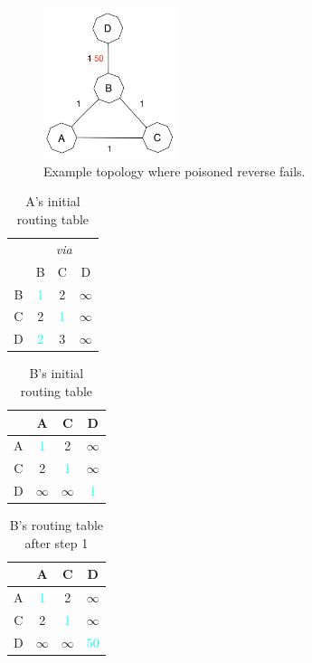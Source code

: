 \documentclass[12pt,a4paper]{article}
\begin{document}
\begin{figure}[!ht]
\centering
\includegraphics[width=0.35\textwidth]{Fail.png}
\caption{Example topology where poisoned reverse fails.}
\label{fig:fail}
\end{figure}

\begin{table}[!ht]
\centering
\begin{tabular}{c|ccc}
	& \multicolumn{3}{c}{\textit{via}} \\
	&	B			&	C			&	D			\\
\hline
B	& 	\textcolor{Cyan}{1}	&	2			&	$\infty$	\\
C	&	2			&	\textcolor{Cyan}{1}	&	$\infty$	\\
D	&	\textcolor{Cyan}{2}	&	3			&	$\infty$	\\
\end{tabular}
\caption{A's initial routing table}
\end{table}

\begin{table}[!ht]
\centering
\begin{tabular}{c|ccc}
	&	A			&	C			&	D			\\
\hline
A	& 	\textcolor{Cyan}{1}	&	2			&	$\infty$	\\
C	&	2			&	\textcolor{Cyan}{1}	&	$\infty$	\\
D	&	$\infty$	&	$\infty$	&	\textcolor{Cyan}{1}	\\
\end{tabular}
\caption{B's initial routing table}
\end{table}

\begin{table}[!ht]
\centering
\begin{tabular}{c|ccc}
	&	A			&	C			&	D			\\
\hline
A	& 	\textcolor{Cyan}{1}	&	2			&	$\infty$	\\
C	&	2			&	\textcolor{Cyan}{1}	&	$\infty$	\\
D	&	$\infty$	&	$\infty$	&	\textcolor{Cyan}{50}	\\
\end{tabular}
\caption{B's routing table after step 1}
\end{table}
\end{document}
